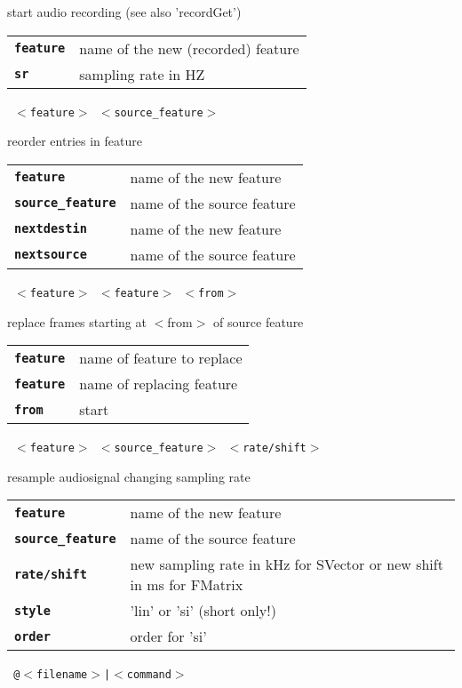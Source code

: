 \begin{description}
\begin{description}
        start audio recording (see also 'recordGet')

      \begin{tabular}{ll}
 \texttt{\textbf{feature}} &  name of the new (recorded) feature \\
 \texttt{\textbf{sr}} &        sampling rate in HZ  \\
      \end{tabular}
       \texttt{ $<$feature$>$ $<$source\_feature$>$  } \

        reorder entries in feature

      \begin{tabular}{ll}
 \texttt{\textbf{feature}} &         name of the new feature \\
 \texttt{\textbf{source\_feature}} &  name of the source feature \\
 \texttt{\textbf{nextdestin}} &       name of the new feature \\
 \texttt{\textbf{nextsource}} &       name of the source feature \\
      \end{tabular}
       \texttt{ $<$feature$>$ $<$feature$>$ $<$from$>$} \

        replace frames starting at $<$from$>$ of source feature

      \begin{tabular}{ll}
 \texttt{\textbf{feature}} &  name of feature to replace \\
 \texttt{\textbf{feature}} &  name of replacing feature \\
 \texttt{\textbf{from}} &     start  \\
      \end{tabular}
       \texttt{ $<$feature$>$ $<$source\_feature$>$ $<$rate/shift$>$  } \

        resample audiosignal changing sampling rate

      \begin{tabular}{ll}
 \texttt{\textbf{feature}} &         name of the new feature \\
 \texttt{\textbf{source\_feature}} &  name of the source feature \\
 \texttt{\textbf{rate/shift}} & new sampling rate in kHz for SVector or new shift in ms for FMatrix  \\
 \texttt{\textbf{style}} &            'lin' or 'si' (short only!)  \\
 \texttt{\textbf{order}} &            order for 'si'  \\
      \end{tabular}
       \texttt{ @$<$filename$>$|$<$command$>$} \


\end{description}
\end{description}
